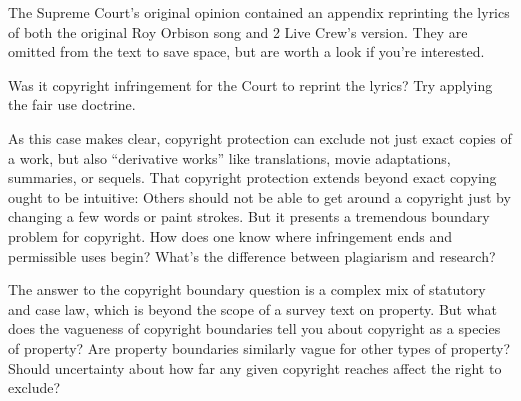 
\item The Supreme Court's original opinion contained an appendix reprinting the
lyrics of both the original Roy Orbison song and 2 Live Crew's version. They are
omitted from the text to save space, but are worth a look if you're interested.

Was it copyright infringement for the Court to reprint the lyrics? Try applying
the fair use doctrine.


\item As this case makes clear, copyright protection can exclude not just exact
copies of a work, but also ``derivative works'' like translations, movie
adaptations, summaries, or sequels. That copyright protection extends beyond
exact copying ought to be intuitive: Others should not be able to get around a
copyright just by changing a few words or paint strokes. But it presents a
tremendous boundary problem for copyright. How does one know where
infringement ends and permissible uses begin? What's the difference between
plagiarism and research?

The answer to the copyright boundary question is a complex mix of statutory and
case law, which is beyond the scope of a survey text on property. But what does
the vagueness of copyright boundaries tell you about copyright as a species of
property? Are property boundaries similarly vague for other types of property?
Should uncertainty about how far any given copyright reaches affect the right to
exclude?







